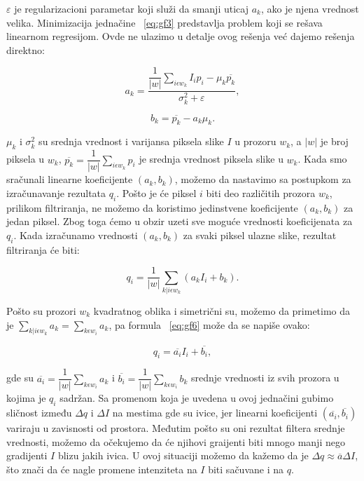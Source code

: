 \documentclass[a4paper,12pt,titlepage]{article}
\begin{document}
$\varepsilon$ je regularizacioni parametar koji služi da smanji uticaj $a_k$, ako je njena vrednost velika. Minimizacija jednačine ~\ref{eq:gf3} predstavlja problem koji se rešava linearnom regresijom. Ovde ne ulazimo u detalje ovog rešenja već dajemo rešenja direktno:

\begin{equation}\label{eq:gf4}
a_k = \dfrac{\dfrac{1}{|w|} \sum_{i \epsilon w_k} I_ip_i - \mu_k \overline{p_k}}{\sigma_k^2 + \varepsilon},
\end{equation}

\begin{equation}\label{eq:gf5}
b_k = \overline{p_k} - a_k \mu_k.
\end{equation}

$\mu_k$ i $\sigma_k^2$ su srednja vrednost i varijansa piksela slike $I$ u prozoru $w_k$, a $|w|$ je broj piksela u $w_k$, $\overline{p_k} = \dfrac{1}{|w|} \sum_{i \epsilon w_k} p_i$ je srednja vrednost piksela slike u $w_k$. Kada smo sračunali linearne koeficijente $(a_k, b_k)$, možemo da nastavimo sa postupkom za izračunavanje rezultata $q_i$. Pošto je će piksel $i$ biti deo različitih prozora $w_k$, prilikom filtriranja, ne možemo da koristimo jedinstvene koeficijente $(a_k, b_k)$ za jedan piksel. Zbog toga ćemo u obzir uzeti sve moguće vrednosti koeficijenata za $q_i$. Kada izračunamo vrednosti $(a_k, b_k)$ za svaki piksel ulazne slike, rezultat filtriranja će biti:

\begin{equation}\label{eq:gf6}
q_i = \dfrac{1}{|w|} \sum_{k|i \epsilon w_k} (a_kI_i + b_k).
\end{equation} 

Pošto su prozori $w_k$ kvadratnog oblika i simetrični su, možemo da primetimo da je $\sum_{k|i \epsilon w_k} a_k = \sum_{k \epsilon w_i} a_k$, pa formula ~\ref{eq:gf6} može da se napiše ovako:

\begin{equation}\label{eq:gf7}
q_i = \overline{a_i}I_i + \overline{b_i},
\end{equation}

gde su $\overline{a_i} = \dfrac{1}{|w|}\sum_{k \epsilon w_i} a_k$ i $\overline{b_i} = \dfrac{1}{|w|}\sum_{k \epsilon w_i} b_k$ srednje vrednosti iz svih prozora u kojima je $q_i$ sadržan. Sa promenom koja je uvedena u ovoj jednačini gubimo sličnost između $\Delta q$ i $\Delta I$ na mestima gde su ivice, jer linearni koeficijenti $(\overline{a_i}, \overline{b_i})$ variraju u zavisnosti od prostora. Međutim pošto su oni rezultat filtera srednje vrednosti, možemo da očekujemo da će njihovi graijenti biti mnogo manji nego gradijenti $I$ blizu jakih ivica. U ovoj situaciji možemo da kažemo da je $\Delta q \approx \overline{a} \Delta I$, što znači da će nagle promene intenziteta na $I$ biti sačuvane i na $q$. 
\end{document}
